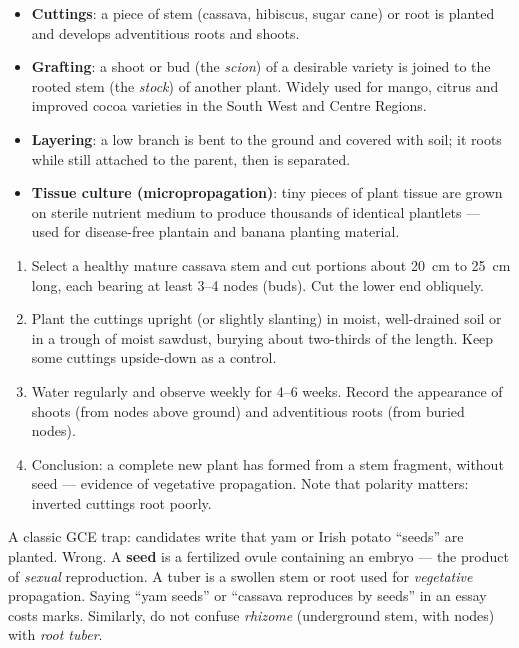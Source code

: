 \documentclass[11pt]{article}
\begin{document}
\begin{itemize}
\item \textbf{Cuttings}: a piece of stem (cassava, hibiscus, sugar cane) or root is planted and develops adventitious roots and shoots.
\item \textbf{Grafting}: a shoot or bud (the \emph{scion}) of a desirable variety is joined to the rooted stem (the \emph{stock}) of another plant. Widely used for mango, citrus and improved cocoa varieties in the South West and Centre Regions.
\item \textbf{Layering}: a low branch is bent to the ground and covered with soil; it roots while still attached to the parent, then is separated.
\item \textbf{Tissue culture (micropropagation)}: tiny pieces of plant tissue are grown on sterile nutrient medium to produce thousands of identical plantlets --- used for disease-free plantain and banana planting material.
\end{itemize}

\begin{methode}
\begin{enumerate}
\item Select a healthy mature cassava stem and cut portions about \SI{20}{cm} to \SI{25}{cm} long, each bearing at least 3--4 nodes (buds). Cut the lower end obliquely.
\item Plant the cuttings upright (or slightly slanting) in moist, well-drained soil or in a trough of moist sawdust, burying about two-thirds of the length. Keep some cuttings upside-down as a control.
\item Water regularly and observe weekly for 4--6 weeks. Record the appearance of shoots (from nodes above ground) and adventitious roots (from buried nodes).
\item Conclusion: a complete new plant has formed from a stem fragment, without seed --- evidence of vegetative propagation. Note that polarity matters: inverted cuttings root poorly.
\end{enumerate}
\end{methode}

\begin{attention}
A classic GCE trap: candidates write that yam or Irish potato ``seeds'' are planted. Wrong. A \textbf{seed} is a fertilized ovule containing an embryo --- the product of \emph{sexual} reproduction. A tuber is a swollen stem or root used for \emph{vegetative} propagation. Saying ``yam seeds'' or ``cassava reproduces by seeds'' in an essay costs marks. Similarly, do not confuse \emph{rhizome} (underground stem, with nodes) with \emph{root tuber}.
\end{attention}
\end{document}
